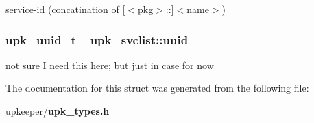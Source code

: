 service-id (concatination of [$<$pkg$>$::]$<$name$>$) 

\subsubsection{\setlength{\rightskip}{0pt plus 5cm}\bf{upk\_\-uuid\_\-t} \bf{\_\-upk\_\-svclist::uuid}}\label{struct__upk__svclist_345fb401183a6de1c3e980d2ee3c018a}


not sure I need this here; but just in case for now 

The documentation for this struct was generated from the following file:\begin{CompactItemize}
\item 
upkeeper/\bf{upk\_\-types.h}\end{CompactItemize}
